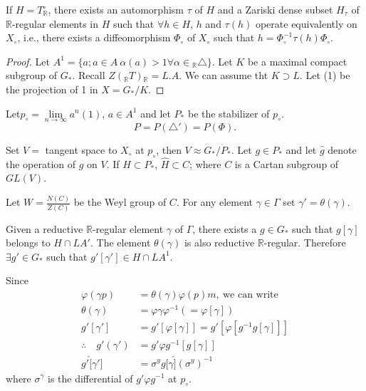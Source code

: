 \begin{lemma} \label{chap8:lem8.6}
  If $H= T^\circ_\mathbb{R}$, there exists an automorphism $\tau$ of
  $H$ and a Zariski dense subset $H_\tau$ of $\mathbb{R}$-regular
  elements in $H$ such that $\forall h \in H$, $h$ and $\tau(h)$
  operate equivalently on $X_\circ$, i.e., there exists a
  diffeomorphism $\Phi_\circ$ of $X_\circ$ such that $h=
  \Phi_\circ^{-1} \tau (h) \Phi_\circ$.
\end{lemma}

\begin{proof}
  Let $A^1 = \{ a; a \in A ~\alpha (a) >1 \forall \alpha \in
  {}_\mathbb{R} \triangle\}$. Let $K$ be a maximal compact subgroup of
  $G_*$. Recall $Z ({}_\mathbb{R} T){}_\mathbb{R}= L.A$. We can assume
  tht $K \supset L$. Let (1) be the projection of 1 in $X= G_*/K$.
\end{proof}

Let\pageoriginale $p_\circ= \lim\limits_{n \to \infty} a^n (1)$, $a \in A^1$ and let
$P_*$ be the stabilizer of $p_\circ$. 
$$
P= P (\triangle')= P (\Phi).
$$

Set $V=$ tangent space to $X_\circ$ at $p_\circ$, then $V \approx
\dot{G}_*/ \dot{P}_*$. Let $g \in P_*$ and let $\hat{g}$ denote the
operation of $g$ on $V$. If $H \subset P_*$, $\hat{H} \subset C$;
where $C$ is a Cartan subgroup of $GL (V)$.

Let $W= \frac{N(C)}{Z(C)}$ be the Weyl group of $C$. For any element
$\gamma \in \Gamma$ set $\gamma'= \theta (\gamma)$.

Given a reductive $\mathbb{R}$-regular element $\gamma$ of $\Gamma$,
there exists a $g \in G_*$ such that $g[\gamma]$ belongs to $H \cap
LA'$. The element $\theta (\gamma)$ is also reductive
$\mathbb{R}$-regular. Therefore $\exists g' \in G_*$ such that $g'
[\gamma'] \in H \cap LA^1$.

Since
\begin{align*}
  \varphi (\gamma p) & = \theta (\gamma) \varphi (p)m, ~\text{we can
    write}\\
  \theta (\gamma) & = \varphi \gamma \varphi^{-1} (=
  \varphi[\gamma])\\ 
  g' [\gamma'] & = g' [\varphi[\gamma]]= g' [\varphi[g^{-1} g
      [\gamma]]]\\ 
  \therefore \quad g' (\gamma') & = g' \varphi g^{-1} [g [\gamma]]\\
  g' \hat{[}\gamma'] & = \sigma^y g [\gamma\hat{]} (\sigma^y)^{-1}
\end{align*}
where $\sigma^\gamma$ is the differential of $g' \varphi g^{-1}$ at
$p_\circ$.

